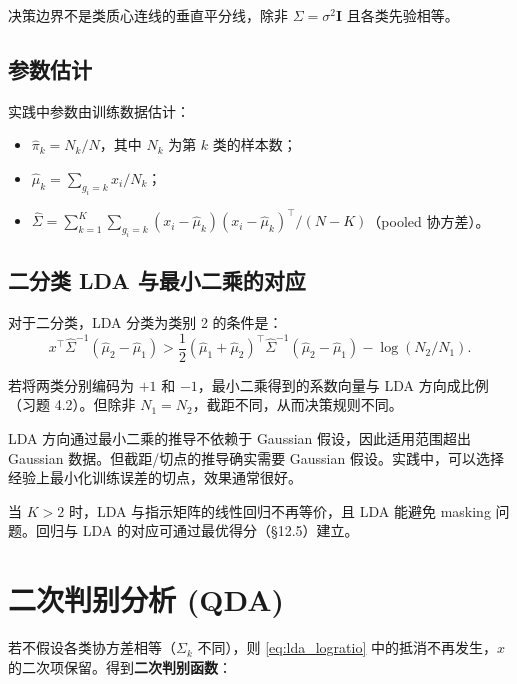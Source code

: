 \begin{remark}
决策边界不是类质心连线的垂直平分线，除非 $\Sigma = \sigma^2 \mathbf{I}$ 且各类先验相等。
\end{remark}

\subsection{参数估计}

实践中参数由训练数据估计：
\begin{itemize}
    \item $\hat{\pi}_k = N_k / N$，其中 $N_k$ 为第 $k$ 类的样本数；
    \item $\hat{\mu}_k = \sum_{g_i = k} x_i / N_k$；
    \item $\hat{\Sigma} = \sum_{k=1}^{K} \sum_{g_i = k} (x_i - \hat{\mu}_k)(x_i - \hat{\mu}_k)^\top / (N - K)$（pooled 协方差）。
\end{itemize}

\subsection{二分类 LDA 与最小二乘的对应}

对于二分类，LDA 分类为类别 2 的条件是：
\begin{equation}\label{eq:lda_twoclass}
    x^\top \hat{\Sigma}^{-1}(\hat{\mu}_2 - \hat{\mu}_1)
    > \frac{1}{2}(\hat{\mu}_1 + \hat{\mu}_2)^\top \hat{\Sigma}^{-1}(\hat{\mu}_2 - \hat{\mu}_1)
    - \log(N_2 / N_1).
\end{equation}

若将两类分别编码为 $+1$ 和 $-1$，最小二乘得到的系数向量与 LDA 方向成比例（习题 4.2）。但除非 $N_1 = N_2$，截距不同，从而决策规则不同。

\begin{remark}
LDA 方向通过最小二乘的推导不依赖于 Gaussian 假设，因此适用范围超出 Gaussian 数据。但截距/切点的推导确实需要 Gaussian 假设。实践中，可以选择经验上最小化训练误差的切点，效果通常很好。
\end{remark}

当 $K > 2$ 时，LDA 与指示矩阵的线性回归不再等价，且 LDA 能避免 masking 问题。回归与 LDA 的对应可通过最优得分（§12.5）建立。


\section{二次判别分析 (QDA)}

若不假设各类协方差相等（$\Sigma_k$ 不同），则 \eqref{eq:lda_logratio} 中的抵消不再发生，$x$ 的二次项保留。得到\textbf{二次判别函数}：

